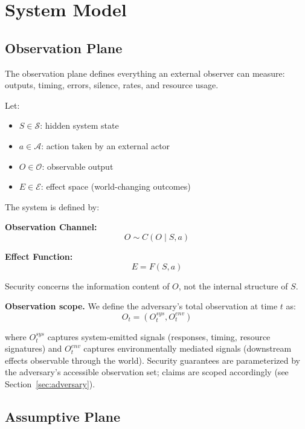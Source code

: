 \documentclass[11pt,a4paper]{article}
\begin{document}
\section{System Model}

\subsection{Observation Plane}

The observation plane defines everything an external observer can measure: outputs, timing, errors, silence, rates, and resource usage.

Let:
\begin{itemize}
  \item $S \in \mathcal{S}$: hidden system state
  \item $a \in \mathcal{A}$: action taken by an external actor
  \item $O \in \mathcal{O}$: observable output
  \item $E \in \mathcal{E}$: effect space (world-changing outcomes)
\end{itemize}

The system is defined by:

\textbf{Observation Channel:}
\begin{equation}
O \sim C(O \mid S, a)
\end{equation}

\textbf{Effect Function:}
\begin{equation}
E = F(S, a)
\end{equation}

Security concerns the information content of $O$, not the internal structure of $S$.

\textbf{Observation scope.} We define the adversary's total observation at time $t$ as:
\begin{equation}
O_t = (O^{sys}_t, O^{env}_t)
\end{equation}

where $O^{sys}_t$ captures system-emitted signals (responses, timing, resource signatures) and $O^{env}_t$ captures environmentally mediated signals (downstream effects observable through the world). Security guarantees are parameterized by the adversary's accessible observation set; claims are scoped accordingly (see Section~\ref{sec:adversary}).

\subsection{Assumptive Plane}
\end{document}

